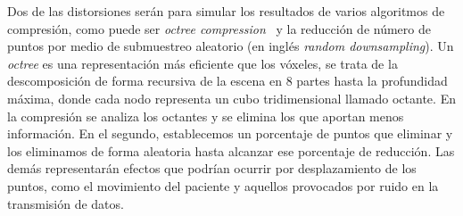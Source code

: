 Dos de las distorsiones serán para simular los resultados de varios algoritmos de 
compresión, como puede ser \emph{octree compression}~\cite{OctreeCompression} 
y la reducción de número de puntos por medio de submuestreo aleatorio (en inglés \emph{random downsampling}). 
Un \emph{octree} es una representación más eficiente que los vóxeles, se trata 
de la descomposición de forma recursiva de la escena en 8 partes hasta 
la profundidad máxima, donde cada nodo representa un cubo tridimensional 
llamado octante. En la compresión se analiza los octantes y se elimina los que aportan 
menos información. 
En el segundo, establecemos un porcentaje de puntos que eliminar y los eliminamos 
de forma aleatoria hasta alcanzar ese porcentaje de reducción.
Las demás representarán efectos que podrían ocurrir por desplazamiento de los puntos, 
como el movimiento del paciente y aquellos provocados por ruido en la transmisión de datos.

